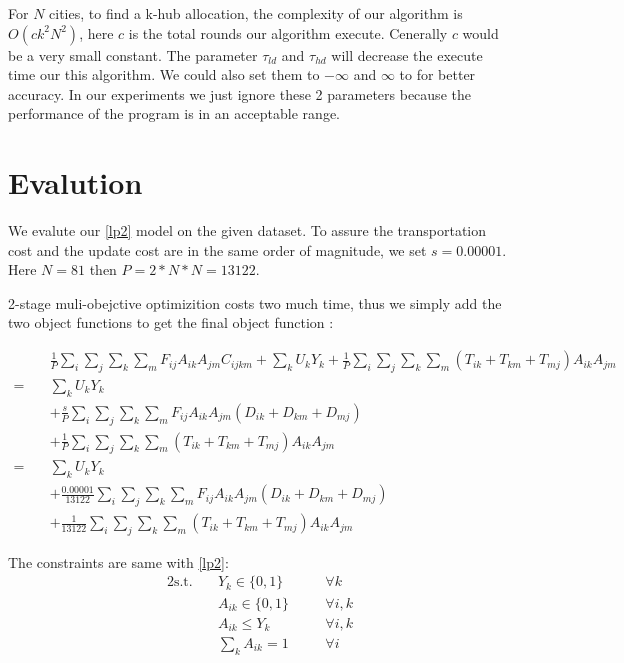 \documentclass{llncs}
\begin{document}
For $N$ cities, to find a k-hub allocation, the complexity of our algorithm is $O(ck^2N^2)$, here $c$ is the total rounds our algorithm execute. Cenerally $c$ would be a very small constant. The parameter $\tau_{ld}$ and $\tau_{hd}$ will decrease the execute time our this algorithm. We could also set them to $-\infty$ and $\infty$ to for better accuracy. In our experiments we just ignore these 2 parameters because the performance of the program is in an acceptable range.

\section{Evalution}
We evalute our \ref{lp2} model on the given dataset.
To assure the transportation cost and the update cost are in the same order of magnitude, we set $s=0.00001$. Here $N=81$ then $P = 2*N*N = 13122$. 

2-stage muli-obejctive optimizition costs two much time, thus we simply add the two object functions to get the final object function :

\begin{align}
	 \quad & \frac{1}{P} \sum_{i}\sum_{j}\sum_{k}\sum_{m}F_{ij}  A_{ik} A_{jm} C_{ijkm} + \sum_{k}U_k Y_{k} 
	 + \frac{1}{P} \sum_{i}\sum_{j}\sum_{k}\sum_{m}{(T_{ik}+ T_{km}+ T_{mj} ) A_{ik} A_{jm}} \nonumber \\
	 = \quad &   \sum_{k}U_k Y_{k} \nonumber \\
	 & + \frac{s}{P} \sum_{i}\sum_{j}\sum_{k}\sum_{m}F_{ij}  A_{ik} A_{jm} (D_{ik}+D_{km}+D_{mj}) \nonumber\\
     & + \frac{1}{P} \sum_{i}\sum_{j}\sum_{k}\sum_{m}{(T_{ik}+ T_{km}+ T_{mj} ) A_{ik} A_{jm}}	 \nonumber\\
     = \quad &\sum_{k}U_k Y_{k} \nonumber\\
     & + \frac{0.00001}{13122} \sum_{i}\sum_{j}\sum_{k}\sum_{m}F_{ij}  A_{ik} A_{jm} (D_{ik}+D_{km}+D_{mj})   \nonumber\\
     & + \frac{1}{13122} \sum_{i}\sum_{j}\sum_{k}\sum_{m}{(T_{ik}+ T_{km}+ T_{mj} ) A_{ik} A_{jm}}
\end{align}

The constraints are same with \ref{lp2}:
\begin{alignat}{2}
	\mbox{s.t.}  \quad
	&Y_{k} \in \{0,1\} &\quad& \forall k \label{st1.1}\\ 
	&A_{ik} \in \{0,1\} &\quad& \forall i,k \label{st1.2}\\ 
	&A_{ik} \leq Y_{k} &\quad& \forall i,k \label{st1.3}\\
	&\sum_{k}{A_{ik}} = 1 &\quad& \forall i \label{st1.4}
\end{alignat}
\end{document}
